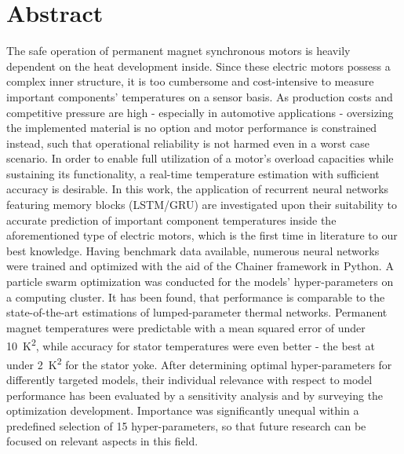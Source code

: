 \chapter{Abstract}

The safe operation of permanent magnet synchronous motors is heavily dependent on the heat development inside.
Since these electric motors possess a complex inner structure, it is too cumbersome and cost-intensive to measure important components' temperatures on a sensor basis. 
As production costs and competitive pressure are high - especially in automotive applications - oversizing the implemented material is no option and motor performance is constrained instead, such that operational reliability is not harmed even in a worst case scenario.
In order to enable full utilization of a motor's overload capacities while sustaining its functionality, a real-time temperature estimation with sufficient accuracy is desirable.
In this work, the application of recurrent neural networks featuring memory blocks (LSTM/GRU) are investigated upon their suitability to accurate prediction of important component temperatures inside the aforementioned type of electric motors, which is the first time in literature to our best knowledge.
Having benchmark data available, numerous neural networks were trained and optimized with the aid of the Chainer framework in Python.
A particle swarm optimization was conducted for the models' hyper-parameters on a computing cluster.
It has been found, that performance is comparable to the state-of-the-art estimations of lumped-parameter thermal networks.
Permanent magnet temperatures were predictable with a mean squared error of under \SI{10}{\kelvin\squared}, while accuracy for stator temperatures were even better - the best at under \SI{2}{\kelvin\squared} for the stator yoke.
After determining optimal hyper-parameters for differently targeted models, their individual relevance with respect to model performance has been evaluated by a sensitivity analysis and by surveying the optimization development.
Importance was significantly unequal within a predefined selection of 15 hyper-parameters, so that future research can be focused on relevant aspects in this field.
